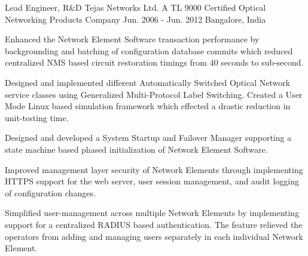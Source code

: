 \begin{cventries}
  \expentry
    {Lead Engineer, R\&D} %
    {Tejas Networks Ltd.} %
    {A TL 9000 Certified Optical Networking Products Company} %
    {Jun. 2006 - Jun. 2012} %
    {Bangalore, India} %
    {
      \begin{cvitems} %
        \item {Enhanced the Network Element Software transaction performance by backgrounding and batching of configuration database commits which reduced centralized NMS based circuit restoration timings from 40 seconds to sub-second.}
        \item {Designed and implemented different Automatically Switched Optical Network service classes using Generalized Multi-Protocol Label Switching. Created a User Mode Linux based simulation framework which effected a drastic reduction in unit-testing time.}
	\item {Designed and developed a System Startup and Failover Manager supporting a state machine based phased initialization of Network Element Software.}
	\item {Improved management layer security of Network Elements through implementing HTTPS support for the web server, user session management, and audit logging of configuration changes.}
	\item {Simplified user-management across multiple Network Elements by implementing support for a centralized RADIUS based authentication. The feature relieved the operators from adding and managing users separately in each individual Network Element.}
      \end{cvitems}
    }

\end{cventries}
